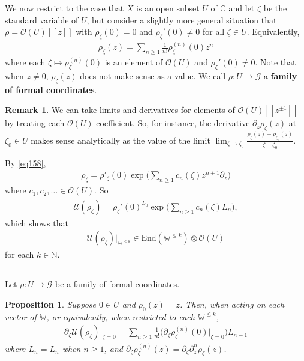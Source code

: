 \documentclass[11pt,b5paper,notitlepage]{article}
\theoremstyle{definition}
\newtheorem{rem}[df]{Remark}
\theoremstyle{plain}
\newtheorem{pp}[df]{Proposition}
\newcommand{\mc}{\mathcal}
\newcommand{\wtd}{\widetilde}
\newcommand{\End}{\mathrm{End}} %
\newcommand{\scr}{\mathscr}
\newcommand{\Wbb}{\mathbb W}
\newcommand{\Cbb}{\mathbb C}
\newcommand{\Nbb}{\mathbb N}
\numberwithin{equation}{section}
\begin{document}
We now restrict to the case that $X$ is an open subset $U$ of $\Cbb$ and let $\zeta$ be the standard variable of $U$, but consider a slightly more general situation that $\rho=\scr O(U)[[z]]$ with $\rho_\zeta(0)=0$ and $\rho_\zeta'(0)\neq0$ for all $\zeta\in U$. Equivalently,
\begin{align}
	\rho_\zeta(z)=\sum_{n\geq 1}\frac 1{n!}\rho_\zeta^{(n)}(0)z^n
\end{align}
where each $\zeta\mapsto\rho_\zeta^{(n)}(0)$ is an element of $\scr O(U)$ and $\rho_\zeta'(0)\neq0$. Note that when $z\neq0$, $\rho_\zeta(z)$ does not make sense as a value. We call $\rho:U\rightarrow\mc G$ a \textbf{family of formal coordinates}.

\begin{rem}\label{lb96}
We can take limits and derivatives for elements of $\scr O(U)[[z^{\pm1}]]$ by treating each $\scr O(U)$-coefficient. So, for instance, the derivative $\partial_z\rho_\zeta(z)$ at $\zeta_0\in U$ makes sense analytically as the value of the limit $\lim_{\zeta\rightarrow\zeta_0}\frac{\rho_\zeta(z)-\rho_{\zeta_0}(z)}{\zeta-\zeta_0}$.
\end{rem}

By \eqref{eq158},
\begin{align}
	\rho_\zeta=\rho'_\zeta(0)\exp\Big(\sum_{n\geq 1}c_n(\zeta)z^{n+1}\partial_z\Big)	\label{eq165}
\end{align}
where $c_1,c_2,\dots\in\scr O(U)$. So
\begin{align}
\mc U(\rho_\zeta)=\rho_\zeta'(0)^{\wtd L_0}\exp\Big(\sum_{n\geq 1}c_n(\zeta)L_n\Big),\label{eq167}
\end{align}
which shows that
\begin{align}
	\mc U(\rho_\zeta)\big|_{\Wbb^{\leq k}}\in\End(\Wbb^{\leq k})\otimes\scr O(U)\label{eq170}	
\end{align}
for each $k\in\Nbb$.

\subsection{}


Let $\rho:U\rightarrow\mc G$ be a family of formal coordinates.

\begin{pp}\label{lb98}
Suppose $0\in U$ and $\rho_0(z)=z$. Then, when acting on each vector of $\Wbb$, or equivalently, when restricted to each $\Wbb^{\leq k}$,
\begin{align}
	\partial_\zeta \mc U(\rho_\zeta)\Big|_{\zeta=0}=\sum_{n\geq 1}\frac 1{n!}\Big(\partial_\zeta\rho_\zeta^{(n)}(0)\Big|_{\zeta=0}\Big) \wtd L_{n-1}\label{eq166}
\end{align}
where $\wtd L_n=L_n$ when $n\geq 1$, and $\partial_\zeta\rho^{(n)}_\zeta(z)=\partial_\zeta\partial_z^n\rho_\zeta(z)$.
\end{pp}
\end{document}
